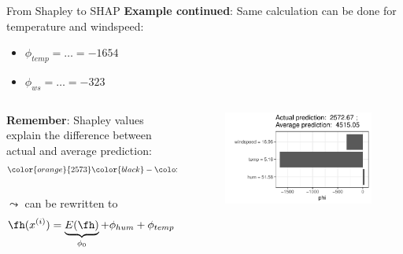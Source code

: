 \documentclass[11pt,compress,t,notes=noshow, aspectratio=169, xcolor=table]{beamer}
\begin{document}
\begin{vbframe}{From Shapley to SHAP}
\textbf{Example continued}: Same calculation can be done for temperature and windspeed:
\begin{itemize}
    \item $\phi_{temp} = \ldots = -1654$
    \item $\phi_{ws} = \ldots = -323$
\end{itemize}

\begin{columns}[T]
\begin{column}{0.5\textwidth}
\textbf{Remember}: Shapley values explain the difference between actual and average prediction:
\begin{eqnarray*}
\color{orange}{2573} \color{black}- \color{blue}{4515} \color{black} = &34 - 1654 - 323 &= - 1942\\
\fh(x^{(i)}) - E(\fh) =& \phi_{hum} + \phi_{temp} + \phi_{ws}&\\
\end{eqnarray*}
$\leadsto$ can be rewritten to
$$
\fh(x^{(i)}) = \underbrace{E(\fh)}_{\phi_0} + \phi_{hum} + \phi_{temp} + \phi_{ws}
$$
\end{column}
\begin{column}{0.5\textwidth}
\begin{figure}
    \centering
    \includegraphics[width=0.9\columnwidth]{figure/shapley2shap.pdf}
\end{figure}
\end{column}
\end{columns}




\end{vbframe}
\end{document}
